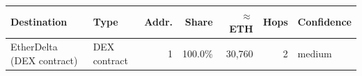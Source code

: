 \begin{tabular}{p{3.8cm} p{3.3cm} r r r r p{1.8cm}}\toprule
\textbf{Destination} & \textbf{Type} & \textbf{Addr.} & \textbf{Share} & \textbf{$\approx$ ETH} & \textbf{Hops} & \textbf{Confidence}\\\midrule
EtherDelta (DEX contract) & DEX contract & 1 & 100.0\% & 30,760 & 2 & medium\\
\bottomrule\end{tabular}

